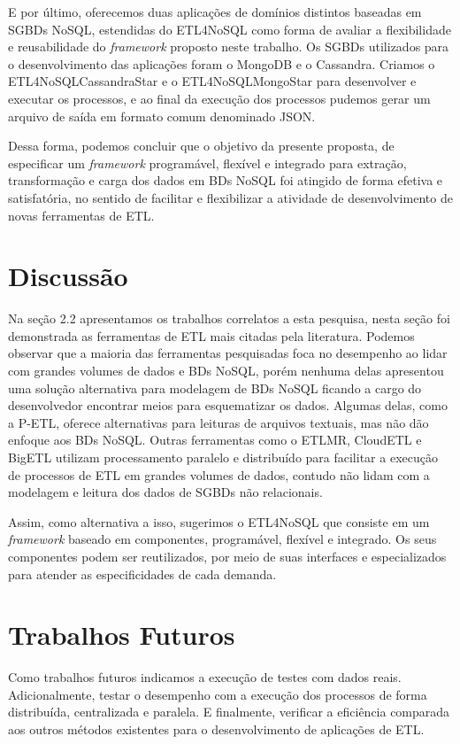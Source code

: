 E por último, oferecemos duas aplicações de domínios distintos baseadas em SGBDs NoSQL, estendidas do ETL4NoSQL como forma de avaliar a flexibilidade e reusabilidade do \textit{framework} proposto neste trabalho. Os SGBDs utilizados para o desenvolvimento das aplicações foram o MongoDB e o Cassandra. Criamos o ETL4NoSQLCassandraStar e o ETL4NoSQLMongoStar para desenvolver e executar os processos, e ao final da execução dos processos pudemos gerar um arquivo de saída em formato comum denominado JSON. 

Dessa forma, podemos concluir que o objetivo da presente proposta, de especificar um \textit{framework} programável, flexível e integrado para extração, transformação e carga dos dados em BDs NoSQL foi atingido de forma efetiva e satisfatória, no sentido de facilitar e flexibilizar a atividade de desenvolvimento de novas ferramentas de ETL.

\section{Discussão}

Na seção 2.2 apresentamos os trabalhos correlatos a esta pesquisa, nesta seção foi demonstrada as ferramentas de ETL mais citadas pela literatura. Podemos observar que a maioria das ferramentas pesquisadas foca no desempenho ao lidar com grandes volumes de dados e BDs NoSQL, porém nenhuma delas apresentou uma solução alternativa para modelagem de BDs NoSQL ficando a cargo do desenvolvedor encontrar meios para esquematizar os dados. Algumas delas, como a P-ETL, oferece alternativas para leituras de arquivos textuais, mas não dão enfoque aos BDs NoSQL.  Outras ferramentas como o ETLMR, CloudETL e BigETL utilizam processamento paralelo e distribuído para facilitar a execução de processos de ETL em grandes volumes de dados, contudo não lidam com a modelagem e leitura dos dados  de SGBDs não relacionais.

Assim, como alternativa a isso, sugerimos o ETL4NoSQL que consiste em um \textit{framework} baseado em componentes, programável, flexível e integrado. Os seus componentes podem ser reutilizados, por meio de suas interfaces e especializados para atender as especificidades de cada demanda.


\section{Trabalhos Futuros}

Como trabalhos futuros indicamos a execução de testes com dados reais. Adicionalmente, testar o desempenho com a execução dos processos de forma distribuída, centralizada e paralela. E finalmente, verificar a eficiência comparada aos outros métodos existentes para o desenvolvimento de aplicações de ETL.


